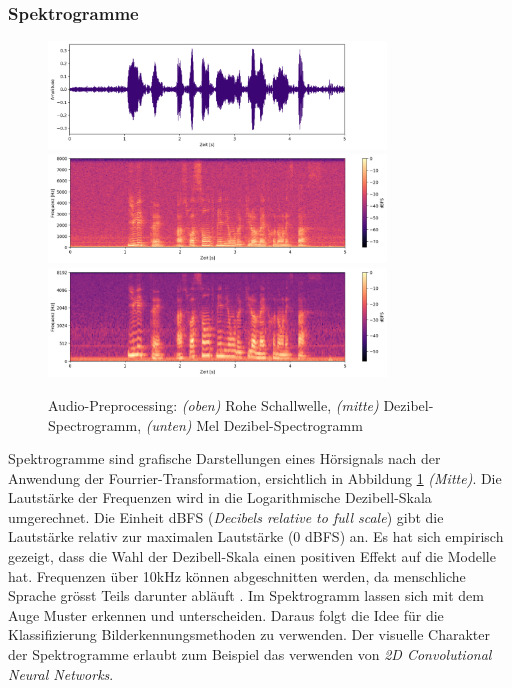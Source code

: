 \subsubsection{Spektrogramme} 
\begin{figure}[hbt]
	\centering
		\includegraphics[width=0.8\textwidth]{assets/audio_raw.png}
		\includegraphics[width=0.8\textwidth]{assets/audio_linear.png}
		\includegraphics[width=0.8\textwidth]{assets/audio_mel.png}
	\centering
	\caption{Audio-Preprocessing: \textit{(oben)} Rohe Schallwelle, \textit{(mitte)}
		     Dezibel-Spectrogramm, 
		     \textit{(unten)} Mel Dezibel-Spectrogramm}
	\label{img:preprocessing}
\end{figure}
Spektrogramme sind grafische Darstellungen eines Hörsignals nach der Anwendung der Fourrier-Transformation\parencite[]['Spectrograms']{fourrier}, ersichtlich in Abbildung \ref{img:preprocessing} \textit{(Mitte)}. Die Lautstärke der Frequenzen wird in die Logarithmische Dezibell-Skala umgerechnet. Die Einheit dBFS (\textit{Decibels relative to full scale}) gibt die Lautstärke relativ zur maximalen Lautstärke (0 dBFS) an. Es hat sich empirisch gezeigt, dass die Wahl der Dezibell-Skala einen positiven Effekt auf die Modelle hat. Frequenzen über 10kHz können abgeschnitten werden, da menschliche Sprache grösst Teils darunter abläuft \parencite{tenkHz}. Im Spektrogramm lassen sich mit dem Auge Muster erkennen und unterscheiden. Daraus folgt die Idee für die Klassifizierung Bilderkennungsmethoden zu verwenden. Der visuelle Charakter der Spektrogramme erlaubt zum Beispiel das verwenden von \textit{2D Convolutional Neural Networks}.

